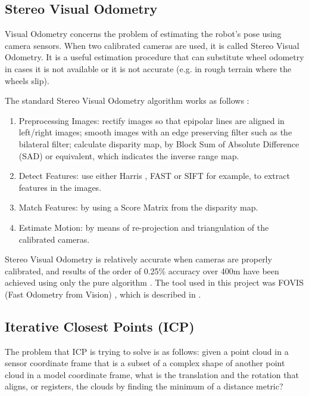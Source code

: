 \documentclass[11pt]{article}
\begin{document}
	
	\subsection{Stereo Visual Odometry}
	\label{subs:SVO}

Visual Odometry concerns the problem of estimating the robot's pose using camera sensors. When two calibrated cameras are used, it is called Stereo Visual Odometry. It is a useful estimation procedure that can substitute wheel odometry in cases it is not available or it is not accurate (e.g. in rough terrain where the wheels slip).
	
The standard Stereo Visual Odometry algorithm works as follows \cite{StereoVis1}:

\begin{enumerate}[leftmargin=.8in]
\item Preprocessing Images: rectify images so that epipolar lines are aligned in left/right images; smooth images with an edge preserving filter such as the bilateral filter; calculate disparity map, by Block Sum of Absolute Difference (SAD) or equivalent, which indicates the inverse range map.
\item Detect Features: use either Harris \cite{Harris}, FAST \cite{FAST} or  SIFT \cite{SIFT} for example, to extract features in the images.
\item Match Features: by using a Score Matrix from the disparity map.
\item Estimate Motion: by means of re-projection and triangulation of the calibrated cameras.
\end{enumerate}
	
Stereo Visual Odometry is relatively accurate when cameras are properly calibrated, and results of the order of 0.25\% accuracy over 400m have been achieved using only the pure algorithm \cite{StereoVis1}. The tool used in this project was FOVIS (Fast Odometry from Vision) \cite{fovis}, which is described in \cite{VisualOdometry}.
	
	\subsection{Iterative Closest Points (ICP)}
	\label{subs:ICP}
The problem that ICP is trying to solve is as follows: given a point cloud in a sensor coordinate frame that is a subset of a complex shape of another point cloud in a model coordinate frame, what is the translation and the rotation that aligns, or registers, the clouds by finding the minimum of a distance metric?
	
\end{document}
